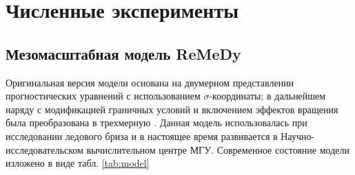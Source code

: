\documentclass[12pt,a4paper]{report}
\begin{document}
\setcounter{chapter}{2}
\chapter{Численные эксперименты}
\section{Мезомасштабная модель ReMeDy}
Оригинальная версия модели \citep{MillerWhite1984,XueThorpe1991} основана на двумерном представлении прогностических уравнений с использованием $\sigma$-координаты; в дальнейшем наряду с модификацией граничных условий и включением эффектов вращения была преобразована в трехмерную \citep{MirandaPhD}. Данная модель использовалась при исследовании ледового бриза \citep{ChechinEtAl2013} и в настоящее время развивается в Научно-исследовательском вычислительном центре МГУ. Современное состояние модели изложено в виде табл. \ref{tab:model}
\end{document}
